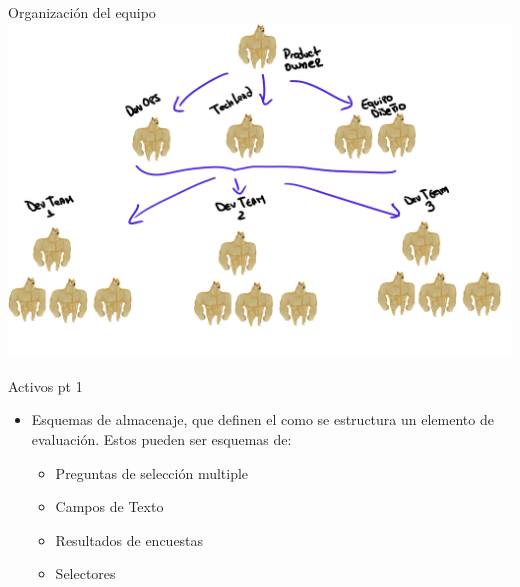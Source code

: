 \documentclass{beamer}
\begin{document}
\begin{frame}{Organización del equipo}
    \centering
    \includegraphics[height=0.9\textheight]{./fragments/team.png}
    
\end{frame}

\begin{frame}{Activos pt 1}
        
    \begin{itemize}
        \item{ Esquemas de almacenaje, que definen el como se estructura un elemento de evaluación. Estos pueden ser esquemas de:
            \begin{itemize}
                \item Preguntas de selección multiple
                \item Campos de Texto
                \item Resultados de encuestas
                \item Selectores
            \end{itemize}
        }
    \end{itemize}

\end{frame}
\end{document}
